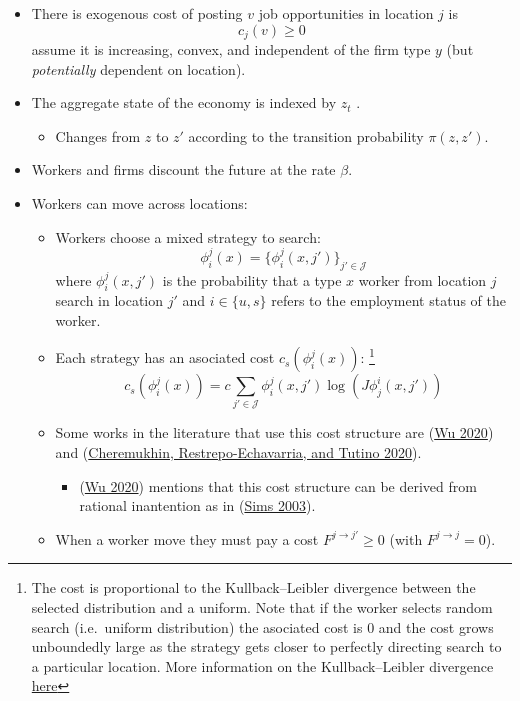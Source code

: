 \documentclass[
  letterpaper,
  DIV=11,
  numbers=noendperiod]{scrreprt}
\providecommand{\tightlist}{%
  \setlength{\itemsep}{0pt}\setlength{\parskip}{0pt}}\usepackage{longtable,booktabs,array}
\begin{document}
\begin{itemize}
\tightlist
\item
  There is exogenous cost of posting \(v\) job opportunities in location
  \(j\) is \[c_{j}(v)\geq0\] assume it is increasing, convex, and
  independent of the firm type \(y\) (but \emph{potentially} dependent
  on location).
\item
  The aggregate state of the economy is indexed by \(z_t\) .

  \begin{itemize}
  \tightlist
  \item
    Changes from \(z\) to \(z'\) according to the transition probability
    \(\pi(z, z')\).
  \end{itemize}
\item
  Workers and firms discount the future at the rate \(\beta\).
\item
  Workers can move across locations:

  \begin{itemize}
  \tightlist
  \item
    Workers choose a mixed strategy to search: \[
    \phi^j_i(x) = \{\phi^j_i(x, j')\}_{j'\in \mathcal{J}}
    \] where \(\phi^j_i(x, j')\) is the probability that a type \(x\)
    worker from location \(j\) search in location \(j'\) and
    \(i\in \{u,s\}\) refers to the employment status of the worker.
  \item
    Each strategy has an asociated cost \(c_s(\phi_i^j(x))\):
    \footnote{The cost is proportional to the Kullback--Leibler
      divergence between the selected distribution and a uniform. Note
      that if the worker selects random search (i.e.~uniform
      distribution) the asociated cost is \(0\) and the cost grows
      unboundedly large as the strategy gets closer to perfectly
      directing search to a particular location. More information on the
      Kullback--Leibler divergence
      \href{https://en.wikipedia.org/wiki/Kullback\%E2\%80\%93Leibler_divergence}{here}}
    \[c_s(\phi^j_i(x)) = c \sum_{j'\in \mathcal{J}}\phi^j_i(x, j')\log{(J\phi^i_j(x, j'))}\]
  \item
    Some works in the literature that use this cost structure are
    (\protect\hyperlink{ref-wuPartiallyDirectedSearch2020}{Wu 2020}) and
    (\protect\hyperlink{ref-cheremukhinTargetedSearchMatching2020}{Cheremukhin,
    Restrepo-Echavarria, and Tutino 2020}).

    \begin{itemize}
    \tightlist
    \item
      (\protect\hyperlink{ref-wuPartiallyDirectedSearch2020}{Wu 2020})
      mentions that this cost structure can be derived from rational
      inantention as in
      (\protect\hyperlink{ref-simsImplicationsRationalInattention2003}{Sims
      2003}).
    \end{itemize}
  \item
    When a worker move they must pay a cost \(F^{j \to j'}\geq 0\) (with
    \(F^{j\to j} = 0\)).
  \end{itemize}
\end{itemize}
\end{document}
